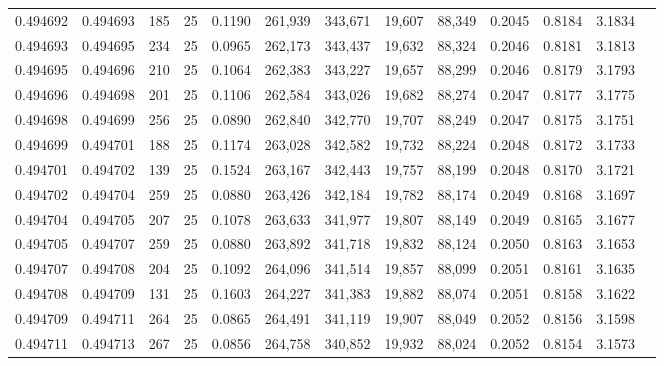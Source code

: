 \begin{tabular}{rrrrrrrrrrrrr}
0.494692 & 0.494693 &   185 &  25 &                                     0.1190 & 261,939 & 343,671 &  19,607 &  88,349 & 0.2045 & 0.8184 & 3.1834 \\
0.494693 & 0.494695 &   234 &  25 &                                     0.0965 & 262,173 & 343,437 &  19,632 &  88,324 & 0.2046 & 0.8181 & 3.1813 \\
0.494695 & 0.494696 &   210 &  25 &                                     0.1064 & 262,383 & 343,227 &  19,657 &  88,299 & 0.2046 & 0.8179 & 3.1793 \\
0.494696 & 0.494698 &   201 &  25 &                                     0.1106 & 262,584 & 343,026 &  19,682 &  88,274 & 0.2047 & 0.8177 & 3.1775 \\
0.494698 & 0.494699 &   256 &  25 &                                     0.0890 & 262,840 & 342,770 &  19,707 &  88,249 & 0.2047 & 0.8175 & 3.1751 \\
0.494699 & 0.494701 &   188 &  25 &                                     0.1174 & 263,028 & 342,582 &  19,732 &  88,224 & 0.2048 & 0.8172 & 3.1733 \\
0.494701 & 0.494702 &   139 &  25 &                                     0.1524 & 263,167 & 342,443 &  19,757 &  88,199 & 0.2048 & 0.8170 & 3.1721 \\
0.494702 & 0.494704 &   259 &  25 &                                     0.0880 & 263,426 & 342,184 &  19,782 &  88,174 & 0.2049 & 0.8168 & 3.1697 \\
0.494704 & 0.494705 &   207 &  25 &                                     0.1078 & 263,633 & 341,977 &  19,807 &  88,149 & 0.2049 & 0.8165 & 3.1677 \\
0.494705 & 0.494707 &   259 &  25 &                                     0.0880 & 263,892 & 341,718 &  19,832 &  88,124 & 0.2050 & 0.8163 & 3.1653 \\
0.494707 & 0.494708 &   204 &  25 &                                     0.1092 & 264,096 & 341,514 &  19,857 &  88,099 & 0.2051 & 0.8161 & 3.1635 \\
0.494708 & 0.494709 &   131 &  25 &                                     0.1603 & 264,227 & 341,383 &  19,882 &  88,074 & 0.2051 & 0.8158 & 3.1622 \\
0.494709 & 0.494711 &   264 &  25 &                                     0.0865 & 264,491 & 341,119 &  19,907 &  88,049 & 0.2052 & 0.8156 & 3.1598 \\
0.494711 & 0.494713 &   267 &  25 &                                     0.0856 & 264,758 & 340,852 &  19,932 &  88,024 & 0.2052 & 0.8154 & 3.1573 \\

\end{tabular}
